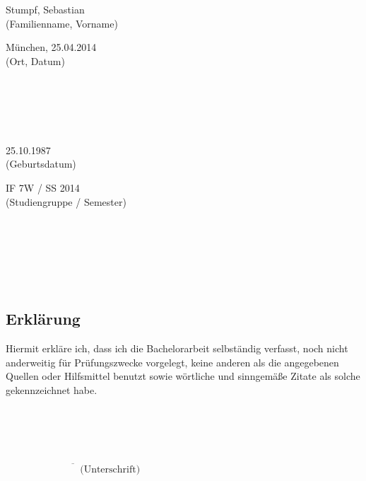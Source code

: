 \newpage
\thispagestyle{empty}
\begin{minipage}[b]{0.5\textwidth} 
Stumpf, Sebastian \\
(Familienname, Vorname)
\end{minipage}
	\hfill
\begin{minipage}[b]{0.5\textwidth}
\begin{flushright}
München, 25.04.2014 \\
(Ort, Datum)
\end{flushright}
\end{minipage}
\\\\\\\\
\begin{minipage}[b]{0.5\textwidth} 
25.10.1987 \\
(Geburtsdatum)
\end{minipage}
	\hfill
\begin{minipage}[b]{0.5\textwidth}
\begin{flushright}
IF 7W / SS 2014 \\
(Studiengruppe / Semester)
\end{flushright}
\end{minipage}
\\ \\ \\ \\ \\
\subsection*{\centering Erklärung}
Hiermit erkläre ich, dass ich die Bachelorarbeit selbständig verfasst, noch nicht anderweitig für Prüfungszwecke vorgelegt, keine anderen als die angegebenen Quellen oder Hilfsmittel benutzt sowie wörtliche und sinngemäße Zitate als solche gekennzeichnet habe.\\\\\\\\\\
\begin{flushright}
$\overline{~~~~~~~~~~~~~~~~~~~~~~~~~~~~~~~~~~\mbox{(Unterschrift)}}$
\end{flushright}
